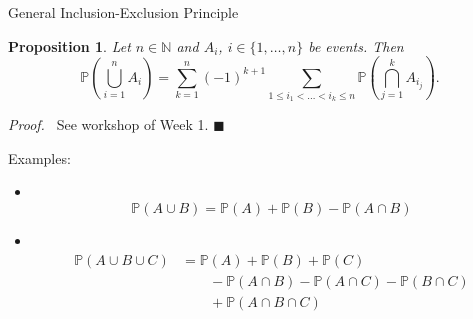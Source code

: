 \documentclass[11pt,pdf,ngerman,UKenglish,handout]{beamer}%
\newcommand{\IN}{\mathds{N}}
\newcommand{\IP}{\mathbb{P}}
\newcommand{\1}{\mathbb{1}}
\renewcommand{\qedsymbol}{$\blacksquare$}
\theoremstyle{thm}
\newtheorem{proposition}[theorem]{Proposition}
\theoremstyle{def}
\renewenvironment{proof}{\par\noindent\textit{Proof.~}}{\hfill \qedsymbol\newline}
\begin{document}
\begin{frame}{General Inclusion-Exclusion Principle}
\begin{proposition}
Let $n \in \IN$ and $A_i$, $i\in \{ 1, \ldots, n \}$ be events. Then
$$\IP\left(\bigcup_{i=1}^n A_i \right) = \sum_{k=1}^n (-1)^{k+1} \sum\limits_{1 \leq i_1 < \ldots < i_k \leq n} \IP\left( \bigcap_{j=1}^k A_{i_j}\right).$$
\end{proposition}
\begin{proof}
See workshop of Week 1.
\end{proof}

Examples:
\begin{itemize}
\item \ \vspace*{-4mm} $$\IP( A \cup B) = \IP(A) + \IP(B) - \IP(A \cap B)$$
\item \ \vspace*{-8mm} 
\begin{align*}
\IP( A \cup B \cup C) 
&= \IP( A) + \IP(B) + \IP(C) 
\\& \qquad
- \IP(A \cap B) - \IP(A \cap C) - \IP(B \cap C) 
\\& \qquad
+ \IP(A \cap B \cap C)
\end{align*}
\end{itemize}
\end{frame}



%
%
%
%
%
%
%
%
%
\end{document}
